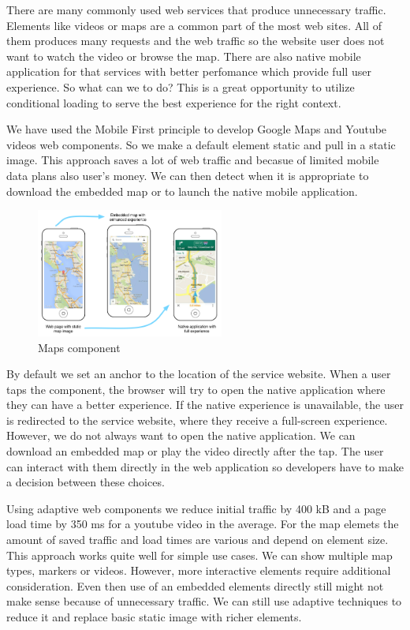 \documentclass{iitsrc}
\begin{document}
There are many commonly used web services that produce unnecessary traffic. Elements like videos or maps are a common part of the most web sites. All of them produces many requests and the web traffic so the website user does not want to watch the video or browse the map. There are also native mobile application for that services with better perfomance which provide full user experience. So what can we to do? This is a great opportunity to utilize conditional loading to serve the best experience for the right context.

We have used the Mobile First principle to develop Google Maps and Youtube videos web components. So we make a default element static and pull in a static image. This approach saves a lot of web traffic and becasue of limited mobile data plans also user's money. We can then detect when it is appropriate to download the embedded map or to launch the native mobile application.

\begin{figure}[ht]
    \begin{center}
        \includegraphics[width=0.55\textwidth]{../images/maps.png}
        \caption{Maps component}
        \label{fig:maps}
    \end{center}
\end{figure}

\noindent By default we set an anchor to the location of the service website. When a user taps the component, the browser will try to open the native application where they can have a better experience. If the native experience is unavailable, the user is redirected to the service website, where they receive a full-screen experience. However, we do not always want to open the native application. We can download an embedded map or play the video directly after the tap. The user can interact with them directly in the web application so developers have to make a decision between these choices.

Using adaptive web components we reduce initial traffic by 400 kB and a page load time by 350 ms for a youtube video in the average. For the map elemets the amount of saved traffic and load times are various and depend on element size. This approach works quite well for simple use cases. We can show multiple map types, markers or videos. However, more interactive elements require additional consideration. Even then use of an embedded elements directly still might not make sense because of unnecessary traffic. We can still use adaptive techniques to reduce it and replace basic static image with richer elements.
\end{document}
